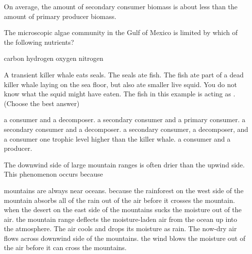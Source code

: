 \question
On average, the amount of secondary consumer biomass is about \underline{\hspace{2cm}} less than the amount of primary producer biomass. 
\begin{choices}
\times%
\times%
\times%
\times%
\times%
\end{choices}



\question
The microscopic algae community in the Gulf of Mexico is limited by which of the following nutrients?

\begin{choices}
\choice carbon%
\choice {}%
\choice hydrogen%
\choice oxygen%
\correctchoice nitrogen%
\end{choices}

\question
A transient killer whale eats seals. The seals ate fish. The fish ate part of a dead killer whale laying on the sea floor, but also ate smaller live squid. You do not know what the squid might have eaten. The fish in this example is acting as \underline{\hspace{2cm}}. (Choose the best answer)

\begin{choices}
\correctchoice a consumer and a decomposer.%
\choice a secondary consumer and a primary consumer.%
\choice a secondary consumer and a decomposer.%
\choice a secondary consumer, a decomposer, and a consumer one trophic level higher than the killer whale.%
\choice a consumer and a producer.%
\end{choices}

\question
The downwind side of large mountain ranges is often drier than the upwind side. This phenomenon occurs because

\begin{choices}
\choice mountains are always near oceans.%
\choice because the rainforest on the west side of the mountain absorbs all of the rain out of the air before it crosses the mountain.%
\choice when the desert on the east side of the mountains sucks the moisture out of the air.%
\correctchoice the mountain range deflects the moisture-laden air from the ocean up into the atmosphere. The air cools and drops its moisture as rain. The now-dry air flows across downwind side of the mountains.%
\choice the wind blows the moisture out of the air before it can cross the mountains.%
\end{choices}

